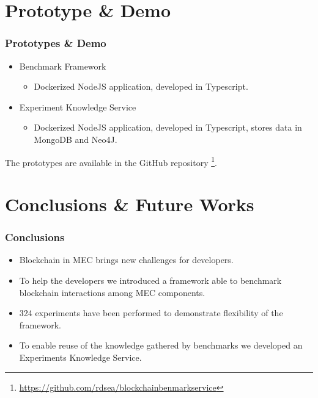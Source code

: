 \documentclass{beamer}
\begin{document}
	\section{Prototype \& Demo}
	
	\begin{frame}
		\frametitle{Prototypes \& Demo}
		\begin{itemize}
			\item Benchmark Framework
			\begin{itemize}
				\item Dockerized NodeJS application, developed in Typescript.
			\end{itemize}
			\item Experiment Knowledge Service
			\begin{itemize}
				\item Dockerized NodeJS application, developed in Typescript, stores data in MongoDB and Neo4J.
			\end{itemize}
		\end{itemize}
		The prototypes are available in the GitHub repository \footnote{\url{https://github.com/rdsea/blockchainbenmarkservice}}.
	
	\end{frame}
	
	\section{Conclusions \& Future Works}

	\begin{frame}
		\frametitle{Conclusions}
		
		\begin{itemize}
			\item Blockchain in \gls{MEC} brings new challenges for developers.
			\item To help the developers we introduced a framework able to benchmark blockchain interactions among \gls{MEC} components.
			\item 324 experiments have been performed to demonstrate flexibility of the framework.
			\item To enable reuse of the knowledge gathered by benchmarks we developed an Experiments Knowledge Service.
		\end{itemize}
		
	\end{frame}
\end{document}

